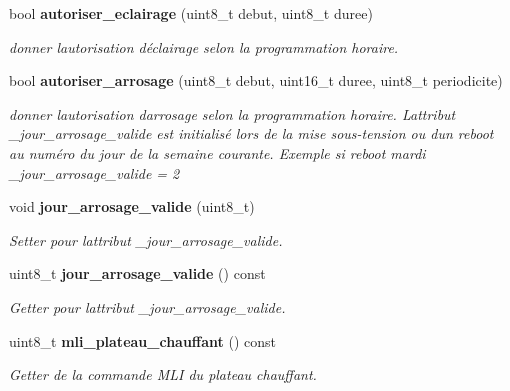 \begin{DoxyCompactItemize}
bool \textbf{ autoriser\+\_\+eclairage} (uint8\+\_\+t debut, uint8\+\_\+t duree)
\begin{DoxyCompactList}\small\item\em donner l\textquotesingle{}autorisation d\textquotesingle{}éclairage selon la programmation horaire. \end{DoxyCompactList}\item 
bool \textbf{ autoriser\+\_\+arrosage} (uint8\+\_\+t debut, uint16\+\_\+t duree, uint8\+\_\+t periodicite)
\begin{DoxyCompactList}\small\item\em donner l\textquotesingle{}autorisation d\textquotesingle{}arrosage selon la programmation horaire. L\textquotesingle{}attribut \+\_\+jour\+\_\+arrosage\+\_\+valide est initialisé lors de la mise sous-\/tension ou d\textquotesingle{}un reboot au numéro du jour de la semaine courante. Exemple si reboot mardi \+\_\+jour\+\_\+arrosage\+\_\+valide = 2 \end{DoxyCompactList}\item 
void \textbf{ jour\+\_\+arrosage\+\_\+valide} (uint8\+\_\+t)
\begin{DoxyCompactList}\small\item\em Setter pour l\textquotesingle{}attribut \+\_\+jour\+\_\+arrosage\+\_\+valide. \end{DoxyCompactList}\item 
uint8\+\_\+t \textbf{ jour\+\_\+arrosage\+\_\+valide} () const
\begin{DoxyCompactList}\small\item\em Getter pour l\textquotesingle{}attribut \+\_\+jour\+\_\+arrosage\+\_\+valide. \end{DoxyCompactList}\item 
uint8\+\_\+t \textbf{ mli\+\_\+plateau\+\_\+chauffant} () const
\begin{DoxyCompactList}\small\item\em Getter de la commande M\+LI du plateau chauffant. \end{DoxyCompactList}\end{DoxyCompactItemize}
